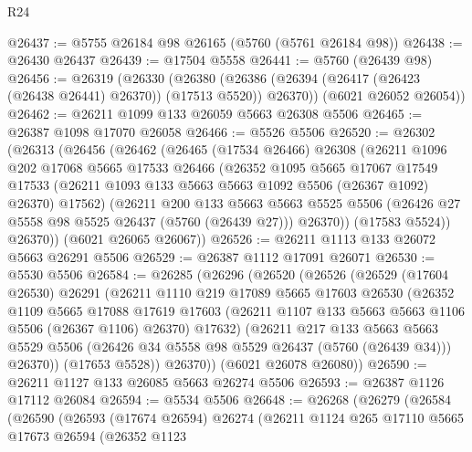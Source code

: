 \begin{lexlean}{R24}
\begin{coremodule}
@26437 := @5755 @26184 @98 @26165 (@5760 (@5761 @26184 @98))
@26438 := @26430 @26437
@26439 := @17504 @5558
@26441 := @5760 (@26439 @98)
@26456 := @26319
    (@26330
      (@26380 (@26386 (@26394 (@26417 (@26423 (@26438 @26441) @26370)) (@17513 @5520)) @26370))
      (@6021 @26052 @26054))
@26462 := @26211 @1099 @133 @26059 @5663 @26308 @5506
@26465 := @26387 @1098 @17070 @26058
@26466 := @5526 @5506
@26520 := @26302
    (@26313
      (@26456
        (@26462
          (@26465
            (@17534 @26466)
            @26308
            (@26211
              @1096
              @202
              @17068
              @5665
              @17533
              @26466
              (@26352
                @1095
                @5665
                @17067
                @17549
                @17533
                (@26211 @1093 @133 @5663 @5663 @1092 @5506 (@26367 @1092) @26370)
                @17562)
              (@26211
                @200
                @133
                @5663
                @5663
                @5525
                @5506
                (@26426 @27 @5558 @98 @5525 @26437 (@5760 (@26439 @27)))
                @26370))
            (@17583 @5524))
          @26370))
      (@6021 @26065 @26067))
@26526 := @26211 @1113 @133 @26072 @5663 @26291 @5506
@26529 := @26387 @1112 @17091 @26071
@26530 := @5530 @5506
@26584 := @26285
    (@26296
      (@26520
        (@26526
          (@26529
            (@17604 @26530)
            @26291
            (@26211
              @1110
              @219
              @17089
              @5665
              @17603
              @26530
              (@26352
                @1109
                @5665
                @17088
                @17619
                @17603
                (@26211 @1107 @133 @5663 @5663 @1106 @5506 (@26367 @1106) @26370)
                @17632)
              (@26211
                @217
                @133
                @5663
                @5663
                @5529
                @5506
                (@26426 @34 @5558 @98 @5529 @26437 (@5760 (@26439 @34)))
                @26370))
            (@17653 @5528))
          @26370))
      (@6021 @26078 @26080))
@26590 := @26211 @1127 @133 @26085 @5663 @26274 @5506
@26593 := @26387 @1126 @17112 @26084
@26594 := @5534 @5506
@26648 := @26268
    (@26279
      (@26584
        (@26590
          (@26593
            (@17674 @26594)
            @26274
            (@26211
              @1124
              @265
              @17110
              @5665
              @17673
              @26594
              (@26352
                @1123

\end{coremodule}
\end{lexlean}
